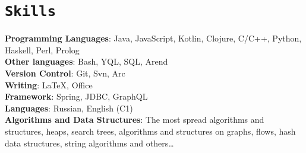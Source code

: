 \documentclass[letterpaper,10pt]{article}
\newcommand{\apricotColor}[1]{\colorbox{Apricot}{\texttt{#1}}}
\begin{document}
\section{\apricotColor{Skills}}
 \begin{itemize}[leftmargin=0.15in, label={}]
    \small{\item{
     \textbf{Programming Languages}{: Java, JavaScript, Kotlin, Clojure, C/C++, Python, Haskell, Perl, Prolog} \\
     \textbf{Other languages}{: Bash, YQL, SQL, Arend}\\
     \textbf{Version Control}{: Git, Svn, Arc} \\
     \textbf{Writing}{: \LaTeX, Office} \\
     \textbf{Framework}{: Spring, JDBC, GraphQL} \\
     \textbf{Languages}{: Russian, English (C1)} \\
     \textbf{Algorithms and Data Structures}{: The most spread algorithms and structures, heaps, search trees, algorithms and structures on graphs, flows, hash data structures, string algorithms and others\dots} \\
    }}
 \end{itemize}
\end{document}
